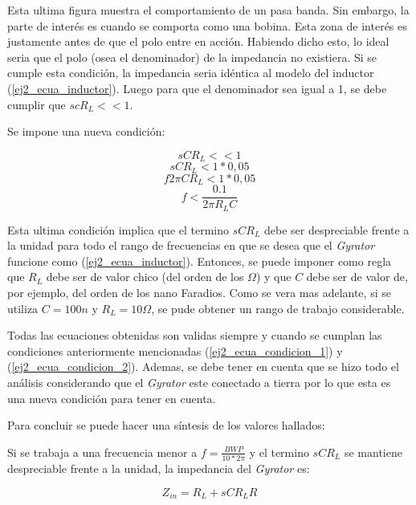 Esta ultima figura muestra el comportamiento de un pasa banda. Sin embargo, la parte de interés es cuando se comporta como una bobina. Esta zona de interés es justamente antes de que el polo entre en acción. Habiendo dicho esto, lo ideal seria que el polo (osea el denominador)
de la impedancia no existiera. Si se cumple esta condición, la impedancia seria idéntica al modelo del inductor (\ref{ej2_ecua_inductor}). Luego para que el denominador sea igual a 1, se debe cumplir que $scR_L << 1 $. 

Se impone una nueva condición:

\begin{displaymath} sCR_L << 1 \end{displaymath}  
\begin{displaymath} sCR_L < 1 * 0,05 \end{displaymath}  
\begin{displaymath} f 2\pi CR_L < 1 * 0,05 \end{displaymath} 
\begin{equation} f < \frac{0.1}{2 \pi R_L C} \label{ej2_ecua_condicion_2} \end{equation}

Esta ultima condición implica que el termino $sCR_L$ debe ser despreciable frente a la unidad para todo el rango de frecuencias en que se desea que el \textit{Gyrator} funcione como (\ref{ej2_ecua_inductor}). Entonces, se puede imponer como regla que $R_L$ debe ser de valor chico (del orden de los $\Omega$) y que $C$ debe ser de valor de, por ejemplo, del orden de los nano Faradios. Como se vera mas adelante, si se utiliza $C = 100n$ y $R_L = 10\Omega$, se pude obtener un rango de trabajo considerable. 

Todas las ecuaciones obtenidas son validas siempre y cuando se cumplan las condiciones anteriormente mencionadas (\ref{ej2_ecua_condicion_1}) y (\ref{ej2_ecua_condicion_2}). Ademas, se debe tener en cuenta que se hizo todo el análisis considerando que el \textit{Gyrator} este conectado a tierra por lo que esta es una nueva condición para tener en cuenta. 

Para concluir se puede hacer una síntesis de los valores hallados:

Si se trabaja a una frecuencia menor a $f = \frac{BWP}{10 *2\pi}$ y el termino $sCR_L$ se mantiene despreciable frente a la unidad, la impedancia del \textit{Gyrator} es:

\begin{displaymath} Z_{in} = R_L + sC R_L R \end{displaymath}

